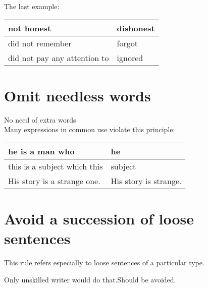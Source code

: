 \documentclass[10pt]{report}
\begin{document}
 
 
 The last example:

	\begin{table}[!tbh]
    \centering
        \begin{tabular}{|m{10em}|m{10em}|}
        \hline

not honest & dishonest\\
\hline
did not remember & forgot \\ 
\hline
did not pay any attention to & ignored\\
\hline


       
        

 \end{tabular}
 \end{table}
 
 
 
 \section {\bfseries Omit needless words}
 
 No need of extra words\\


Many expressions in common use violate this principle:


\begin{table}[!tbh]
    \centering
        \begin{tabular}{|m{10em}|m{10em}|}
        \hline

he is a man who & he\\
\hline
this is a subject which this & subject\\
\hline
His story is a strange one. & His story is strange.\\ \hline




       
        

 \end{tabular}
 \end{table}
 
 
 \section {\bfseries Avoid a succession of loose sentences}
 
 This rule refers especially to loose sentences of a particular type.
 
 Only unskilled writer would do that.Should be avoided.
\end{document}
